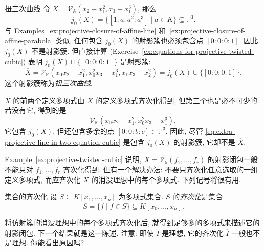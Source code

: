 \begin{Example}{扭三次曲线}\leavevmode\label{ex:projective-twisted-cubic}
令 $X=\mathcal{V}_{\mathbb{A}}(x_{2}-x_{1}^{2},x_{3}-x_{1}^{3})$, 那么
\[
  j_{0}(X)=\{[1:a:a^{2}:a^{3}]\mid a\in K\}\subseteq\mathbb{P}^{3}.
\]
与 Examples~\ref{ex:projective-closure-of-affine-line} 和~\ref{ex:projective-closure-of-affine-parabola} 类似, 任何包含 $j_{0}(X)$ 的射影簇也必须包含点 $[0:0:0:1]$. 因此 $j_{0}(X)$ 不是射影簇. 但直接计算 (Exercise~\ref{ex:equations-for-projective-twisted-cubic}) 表明 $j_{0}(X)\sqcup\{[0:0:0:1]\}$ 是射影簇:
\[
  \overline{X}=\mathcal{V}_{\mathbb{P}}(x_{0}x_{2}-x_{1}^{2},x_{0}^{2}x_{3}-x_{1}^{3},x_{1}x_{3}-x_{2}^{2})
  =j_{0}(X)\cup\{[0:0:0:1]\}.
\]
这个射影簇称为\emph{扭三次曲线}.

$\overline{X}$ 的前两个定义多项式由 $X$ 的定义多项式齐次化得到, 但第三个也是必不可少的. 若没有它, 得到的是
\begin{equation}\label{eq:extra-projective-line-in-two-equation-cubic}
  \mathcal{V}_{\mathbb{P}}(x_{0}x_{2}-x_{1}^{2},x_{0}^{2}x_{3}-x_{1}^{3}),
\end{equation}
它包含 $j_{0}(X)$, 但还包含多余的点 $[0:0:b:c]\in\mathbb{P}^{3}$. 因此, 尽管 \eqref{eq:extra-projective-line-in-two-equation-cubic} 是包含 $j_{0}(X)$ 的射影簇, 它却不是 $\overline{X}$.
\end{Example}

Example~\ref{ex:projective-twisted-cubic} 说明, $X=\mathcal{V}_{\mathbb{A}}(f_{1},\ldots,f_{r})$ 的射影闭包一般不能只对 $f_{1},\ldots,f_{r}$ 齐次化得到. 但有一个解决办法: 不要只齐次化任意选取的一组定义多项式, 而应齐次化 $X$ 的消没理想中的每个多项式. 下列记号将很有用.

\begin{Definition}{集合的齐次化}\leavevmode\label{def:homogenization-of-set}
设 $S\subseteq K[x_{1},\ldots,x_{n}]$ 为多项式集合. $S$ 的\emph{齐次化}是集合
\[
  \overline{S}=\{\overline{f}\mid f\in S\}\subseteq K[x_{0},\ldots,x_{n}].
\]
\end{Definition}

\BookPairedNote
  {将仿射簇的消没理想中的每个多项式齐次化后, 就得到足够多的多项式来描述它的射影闭包. 下一个结果就是这一陈述.}
  {注意: 即使 $I$ 是理想, 它的齐次化 $\overline{I}$ 一般也不是理想. 你能看出原因吗?}


